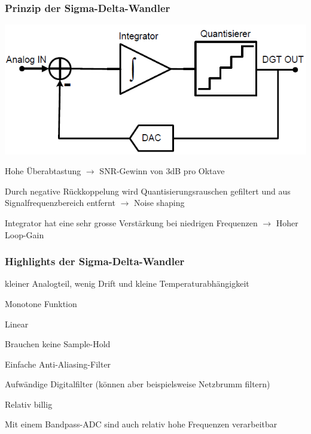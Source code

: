 \subsubsection{Prinzip der Sigma-Delta-Wandler}
\begin{minipage}{0.40\textwidth}
    \includegraphics[width=1.0\textwidth]{images/Prinzipschema2}
\end{minipage}
\hfill
\begin{minipage}{0.55\textwidth}
    \begin{compactitem}
        \item Hohe Überabtastung $\rightarrow$ SNR-Gewinn von 3dB pro Oktave
        \item Durch negative Rückkoppelung wird Quantisierungsrauschen gefiltert und aus Signalfrequenzbereich entfernt $\rightarrow$ Noise shaping
        \item Integrator hat eine sehr grosse Verstärkung bei niedrigen Frequenzen $\rightarrow$ Hoher Loop-Gain
    \end{compactitem}
\end{minipage}
\subsubsection{Highlights der Sigma-Delta-Wandler}
\begin{minipage}{0.55\textwidth}
    \begin{compactitem}
        \item kleiner Analogteil, wenig Drift und kleine Temperaturabhängigkeit
        \item Monotone Funktion
        \item Linear
        \item Brauchen keine Sample-Hold
    \end{compactitem}
\end{minipage}
\hfill
\begin{minipage}{0.40\textwidth}
    \begin{compactitem}
        \item Einfache Anti-Aliasing-Filter
        \item Aufwändige Digitalfilter (können aber beispielsweise Netzbrumm filtern)
        \item Relativ billig
        \item Mit einem Bandpass-ADC sind auch relativ hohe Frequenzen verarbeitbar
    \end{compactitem}
\end{minipage}

